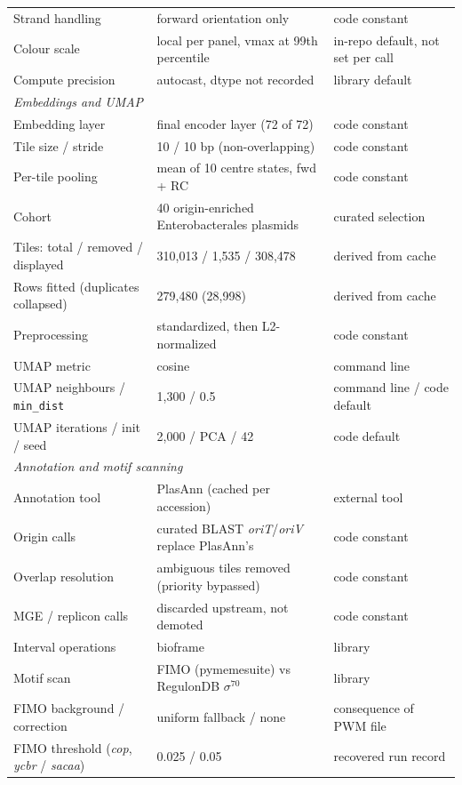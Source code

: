 {\begin{longtable}{p{}p{}p{}}
Strand handling & forward orientation only & code constant \\
Colour scale & local per panel, vmax at 99th percentile & in-repo default, not set per call \\
Compute precision & autocast, dtype not recorded & library default \\
\midrule
\multicolumn{3}{l}{\textit{Embeddings and UMAP}} \\
Embedding layer & final encoder layer (72 of 72) & code constant \\
Tile size / stride & 10 / 10 bp (non-overlapping) & code constant \\
Per-tile pooling & mean of 10 centre states, fwd + RC & code constant \\
Cohort & 40 origin-enriched Enterobacterales plasmids & curated selection \\
Tiles: total / removed / displayed & 310,013 / 1,535 / 308,478 & derived from cache \\
Rows fitted (duplicates collapsed) & 279,480 (28,998) & derived from cache \\
Preprocessing & standardized, then L2-normalized & code constant \\
UMAP metric & cosine & command line \\
UMAP neighbours / \texttt{min\_dist} & 1,300 / 0.5 & command line / code default \\
UMAP iterations / init / seed & 2,000 / PCA / 42 & code default \\
\midrule
\multicolumn{3}{l}{\textit{Annotation and motif scanning}} \\
Annotation tool & PlasAnn (cached per accession) & external tool \\
Origin calls & curated BLAST \emph{oriT}/\emph{oriV} replace PlasAnn's & code constant \\
Overlap resolution & ambiguous tiles removed (priority bypassed) & code constant \\
MGE / replicon calls & discarded upstream, not demoted & code constant \\
Interval operations & bioframe & library \\
Motif scan & FIMO (pymemesuite) vs RegulonDB $\sigma^{70}$ & library \\
FIMO background / correction & uniform fallback / none & consequence of PWM file \\
FIMO threshold (\emph{cop}, \emph{ycbr} / \emph{sacaa}) & 0.025 / 0.05 & recovered run record \\

\end{longtable}}
